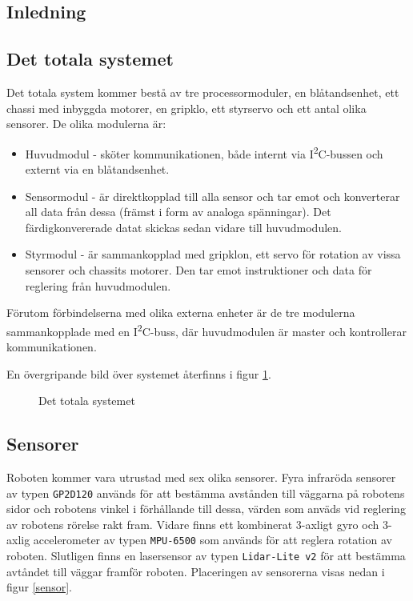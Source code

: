 \documentclass[11pt]{article}
\begin{document}
\begin{flushleft}
\section{Inledning}
\lipsum

\subsection{Det totala systemet}
Det totala system kommer bestå av tre processormoduler, en blåtandsenhet, ett chassi med inbyggda motorer, en gripklo, ett styrservo och ett antal olika sensorer. De olika modulerna är:
\begin{itemize}
	\item Huvudmodul - sköter kommunikationen, både internt via I\textsuperscript{2}C-bussen och externt via en blåtandsenhet.
	\item Sensormodul - är direktkopplad till alla sensor och tar emot och konverterar all data från dessa (främst i form av analoga spänningar). Det färdigkonvererade datat skickas sedan vidare till huvudmodulen.
	\item Styrmodul - är sammankopplad med gripklon, ett servo för rotation av vissa sensorer och chassits motorer. Den tar emot instruktioner och data för reglering från huvudmodulen.
\end{itemize}
Förutom förbindelserna med olika externa enheter är de tre modulerna sammankopplade med en I\textsuperscript{2}C-buss, där huvudmodulen är master och kontrollerar kommunikationen. 

En övergripande bild över systemet återfinns i figur \ref{overview}.

\begin{figure}[!htbp]
\centering
\noindent\resizebox{\linewidth}{!}{
	}
	\caption{Det totala systemet \label{overview}}	
\end{figure}

\FloatBarrier
\subsection{Sensorer}
Roboten kommer vara utrustad med sex olika sensorer. Fyra infraröda sensorer av typen \verb+GP2D120+ används för att bestämma avstånden till väggarna på robotens sidor och robotens vinkel i förhållande till dessa, värden som anväds vid reglering av robotens rörelse rakt fram. Vidare finns ett kombinerat 3-axligt gyro och 3-axlig accelerometer av typen \verb+MPU-6500+ som används för att reglera rotation av roboten. Slutligen finns en lasersensor av typen \verb+Lidar-Lite v2+ för att bestämma avtåndet till väggar framför roboten. Placeringen av sensorerna visas nedan i figur \ref{sensor}.


\end{flushleft}
\end{document}

